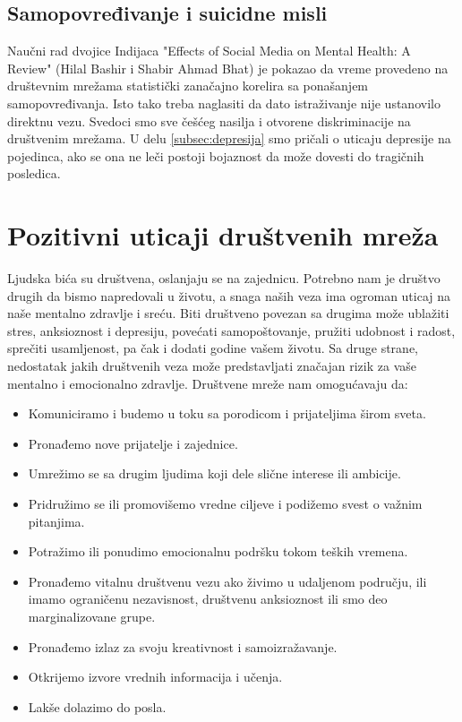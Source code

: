 \documentclass[a4paper]{article}
\begin{document}
{		\subsection{Samopovređivanje i suicidne misli}
		
		Naučni rad dvojice Indijaca "Effects of Social Media on Mental Health: A Review" \cite{prva} (Hilal Bashir i Shabir Ahmad Bhat) je pokazao da vreme provedeno na društevnim mrežama statistički zanačajno korelira sa ponašanjem samopovređivanja. Isto tako treba naglasiti da dato istraživanje nije ustanovilo direktnu vezu. Svedoci smo sve češćeg nasilja i otvorene diskriminacije na društvenim mrežama. U delu \eqref{subsec:depresija} smo pričali o uticaju depresije na pojedinca, ako se ona ne leči postoji bojaznost da može dovesti do tragičnih posledica.
		
		\section{Pozitivni uticaji društvenih mreža}	
		Ljudska bića su društvena, oslanjaju se na zajednicu. Potrebno nam je društvo drugih da bismo napredovali u životu, a snaga naših veza ima ogroman uticaj na naše mentalno zdravlje i sreću. Biti društveno povezan sa drugima može ublažiti stres, anksioznost i depresiju, povećati samopoštovanje, pružiti udobnost i radost, sprečiti usamljenost, pa čak i dodati godine vašem životu. Sa druge strane, nedostatak jakih društvenih veza može predstavljati značajan rizik za vaše mentalno i emocionalno zdravlje. Društvene mreže nam omogućavaju da:
		\begin{itemize}
		\item	Komuniciramo i budemo u toku sa porodicom i prijateljima širom sveta.
		\item Pronađemo nove prijatelje i zajednice.
		\item Umrežimo se sa drugim ljudima koji dele slične interese ili ambicije.
		\item Pridružimo se ili promovišemo vredne ciljeve i podižemo svest o važnim pitanjima.
		\item Potražimo ili ponudimo emocionalnu podršku tokom teških vremena.
		\item Pronađemo vitalnu društvenu vezu ako živimo u udaljenom području, ili imamo ograničenu nezavisnost, društvenu anksioznost ili smo deo marginalizovane grupe.
		\item Pronađemo izlaz za svoju kreativnost i samoizražavanje.
		\item Otkrijemo izvore vrednih informacija i učenja.
		\item Lakše dolazimo do posla.
		

\end{itemize}}
\end{document}
